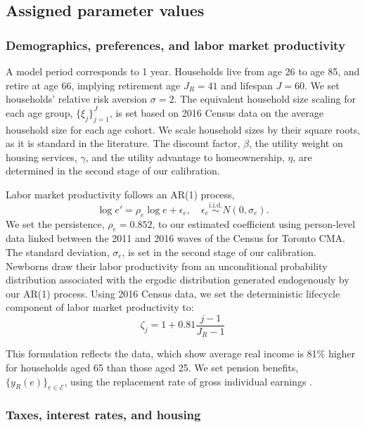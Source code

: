 \documentclass[parskip=full]{article}
\begin{document}
\subsection{Assigned parameter values}

\subsubsection{Demographics, preferences, and labor market productivity}
A model period corresponds to 1 year. Households live from age 26 to age 85, and retire at age 66, implying retirement age $J_{R}=41$ and lifespan $J=60$. We set households' relative risk aversion $\sigma=2$. The equivalent household size scaling for each age group, $\{\xi_{j}\}_{j=1}^{J}$, is set based on 2016 Census data on the average household size for each age cohort. We scale household sizes by their square roots, as it is standard in the literature. The discount factor, $\beta$, the utility weight on housing services, $\gamma$, and the utility advantage to homeownership, $\eta$, are determined in the second stage of our calibration.

Labor market productivity follows an AR(1) process,
\begin{equation*}
  \log e' = \rho_{e} \log e + \epsilon_{e},\quad \epsilon_{e}\overset{\mathrm{i.i.d.}} \sim N(0,\sigma_{e}).
\end{equation*}
We set the persistence, $\rho_{e}=0.852$, to our estimated coefficient using person-level data linked between the 2011 and 2016 waves of the Census for Toronto CMA. The standard deviation, $\sigma_{e}$, is set in the second stage of our calibration. Newborns draw their labor productivity from an unconditional probability distribution associated with the ergodic distribution generated endogenously by our AR(1) process. Using 2016 Census data, we set the deterministic lifecycle component of labor market productivity to: 
\begin{equation*}
\zeta_j = 1+0.81 \frac{j-1}{J_{R}-1}
\end{equation*}

\noindent This formulation reflects the data, which show average real income is 81\% higher for households aged 65 than those aged 25. We set pension benefits, $\{y_{R}(e)\}_{e\in \mathcal{E}}$, using the replacement rate of gross individual earnings \citep{OECD-pension}.

\subsubsection{Taxes, interest rates, and housing}
\end{document}
